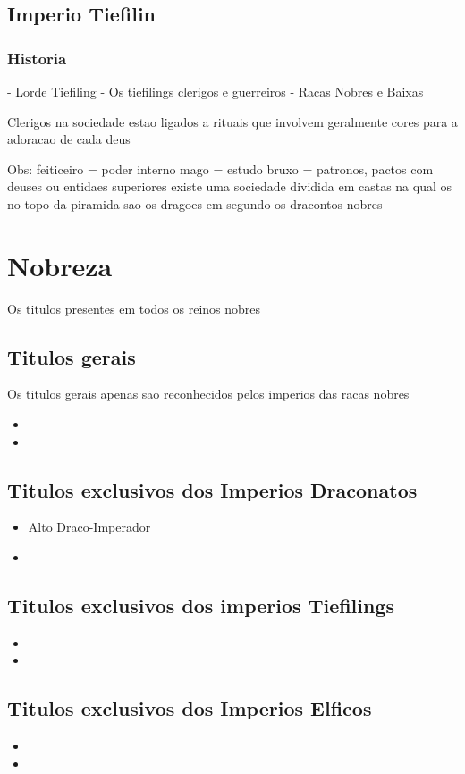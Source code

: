 \documentclass{book}
\begin{document}
\section{Imperio Tiefilin}
\subsection*{Historia}
- Lorde Tiefiling
- Os tiefilings clerigos e guerreiros  
- Racas Nobres e Baixas 

Clerigos na sociedade estao ligados a rituais que involvem geralmente cores para a adoracao de 
cada deus

Obs: 
	 feiticeiro = poder interno
     mago = estudo
     bruxo = patronos, pactos com deuses ou entidaes superiores
     existe uma sociedade dividida em castas na qual os no topo da piramida sao os dragoes em 
     segundo os dracontos nobres
\chapter{Nobreza}
Os titulos presentes em todos os reinos nobres
\section{Titulos gerais}
Os titulos gerais apenas sao reconhecidos pelos imperios das racas nobres
\begin{itemize}
    \item 
    \item
\end{itemize}
\section{Titulos exclusivos dos Imperios Draconatos}

\begin{itemize}
    \item Alto Draco-Imperador
    \item
\end{itemize}

\section{Titulos exclusivos dos imperios Tiefilings}
\begin{itemize}
    \item
    \item
\end{itemize}

\section{Titulos exclusivos dos Imperios Elficos}
\begin{itemize}
    \item
    \item
\end{itemize}
\end{document}
